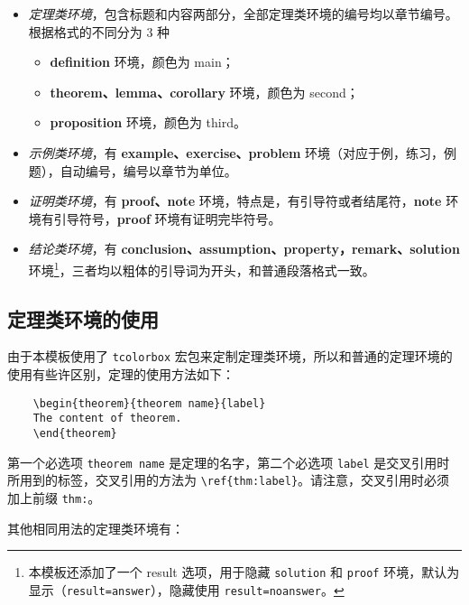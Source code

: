 	\begin{itemize}
	\item \textit{定理类环境}，包含标题和内容两部分，全部定理类环境的编号均以章节编号。根据格式的不同分为 3 种
 \begin{itemize}
    \item \textcolor{main}{\textbf{definition}} 环境，颜色为 \textcolor{main}{main}；
    \item \textcolor{second}{\textbf{theorem、lemma、corollary}} 环境，颜色为 \textcolor{second} {second}；
    \item \textcolor{third}{\textbf{proposition}} 环境，颜色为 \textcolor{third}{third}。
 \end{itemize}
	\item \textit{示例类环境}，有 \textbf{example、exercise、problem} 环境（对应于例，练习，例题），自动编号，编号以章节为单位。
	\item \textit{证明类环境}，有 \textbf{proof、note} 环境，特点是，有引导符或者结尾符，\textbf{note} 环境有引导符号，\textbf{proof} 环境有证明完毕符号。
	\item \textit{结论类环境}，有 \textbf{conclusion、assumption、property，remark、solution} 环境\footnote{本模板还添加了一个 result 选项，用于隐藏 \lstinline{solution} 和 \lstinline{proof} 环境，默认为显示（\lstinline{result=answer}），隐藏使用 \lstinline{result=noanswer}。}，三者均以粗体的引导词为开头，和普通段落格式一致。
	\end{itemize}
	
	\subsection{定理类环境的使用}
	由于本模板使用了 \lstinline{tcolorbox} 宏包来定制定理类环境，所以和普通的定理环境的使用有些许区别，定理的使用方法如下：
	\begin{lstlisting}
	\begin{theorem}{theorem name}{label}
	The content of theorem.
	\end{theorem}
	\end{lstlisting}
	
	第一个必选项 \lstinline{theorem name} 是定理的名字，第二个必选项 \lstinline{label} 是交叉引用时所用到的标签，交叉引用的方法为 \verb|\ref{thm:label}|。请注意，交叉引用时必须加上前缀 \lstinline{thm:}。
	
	其他相同用法的定理类环境有：
	
